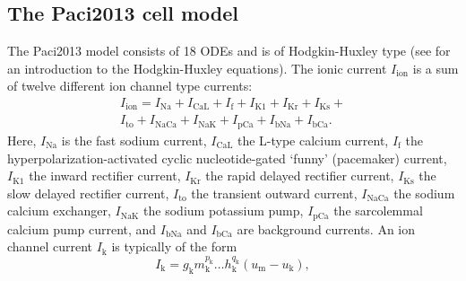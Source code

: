 \documentclass{article}
\begin{document}
\subsection{The Paci2013 cell model} \label{The Paci2013 cell model}
The Paci2013 model consists of 18 ODEs and is of Hodgkin-Huxley type (see \cite[p.195-215]{KeenerI} for an introduction to the Hodgkin-Huxley equations). The ionic current $I_{\mathrm{ion}}$ is a sum of twelve different ion channel type currents:
\begin{eqnarray}
I_{\mathrm{ion}}=I_{\mathrm{Na}}+I_{\mathrm{CaL}}+I_{\mathrm{f}}+I_{\mathrm{K1}}+I_{\mathrm{Kr}}+I_{\mathrm{Ks}}+ \\
I_{\mathrm{to}}+I_{\mathrm{NaCa}}+I_{\mathrm{NaK}}+I_{\mathrm{pCa}}+I_{\mathrm{bNa}}+I_{\mathrm{bCa}}.
\end{eqnarray}
Here, $I_{\mathrm{Na}}$ is the fast sodium current, $I_{\mathrm{CaL}}$ the L-type calcium current, $I_{\mathrm{f}}$ the hyperpolarization-activated cyclic nucleotide-gated `funny' (pacemaker) current, $I_{\mathrm{K1}}$ the inward rectifier current, $I_{\mathrm{Kr}}$ the rapid delayed rectifier current, $I_{\mathrm{Ks}}$ the slow delayed rectifier current, $I_{\mathrm{to}}$ the transient outward current, $I_{\mathrm{NaCa}}$ the sodium calcium exchanger, $I_{\mathrm{NaK}}$ the sodium potassium pump, $I_{\mathrm{pCa}}$ the sarcolemmal calcium pump current, and $I_{\mathrm{bNa}}$ and $I_{\mathrm{bCa}}$ are background currents.
An ion channel current $I_{\mathrm{k}}$ is typically of the form 
\begin{equation}
I_{\mathrm{k}}=g_{\mathrm{k}} m_{\mathrm{k}}^{p_{\mathrm{k}}}\ldots h_{\mathrm{k}}^{q_{\mathrm{k}}}(u_{\mathrm{m}}-u_{\mathrm{k}}),
\end{equation}
\end{document}
